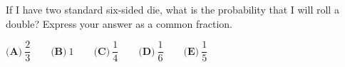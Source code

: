 If I have two standard six-sided die, what is the probability that I will roll a double? Express your answer as a common fraction.

$\textbf{(A)}~\dfrac{2}{3}\qquad\textbf{(B)}~1\qquad\textbf{(C)}~\dfrac{1}{4}\qquad\textbf{(D)}~\dfrac{1}{6}\qquad\textbf{(E)}~\dfrac{1}{5}\qquad$

